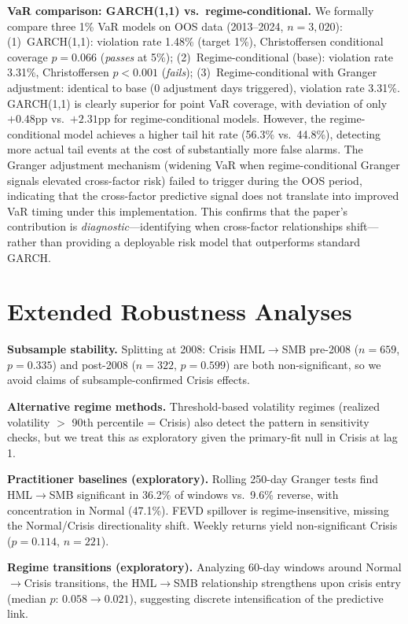 \documentclass[sigconf,anonymous]{acmart}
\begin{document}
\textbf{VaR comparison: GARCH(1,1) vs.\ regime-conditional.}
We formally compare three 1\% VaR models on OOS data (2013--2024, $n = 3{,}020$):
(1)~GARCH(1,1): violation rate 1.48\% (target 1\%), Christoffersen
conditional coverage $p = 0.066$ (\emph{passes} at 5\%);
(2)~Regime-conditional (base): violation rate 3.31\%,
Christoffersen $p < 0.001$ (\emph{fails});
(3)~Regime-conditional with Granger adjustment: identical to base
(0 adjustment days triggered), violation rate 3.31\%.
GARCH(1,1) is clearly superior for point VaR coverage, with deviation
of only $+0.48$pp vs.\ $+2.31$pp for regime-conditional models.
However, the regime-conditional model achieves a higher tail hit rate
(56.3\% vs.\ 44.8\%), detecting more actual tail events at the cost of
substantially more false alarms.
The Granger adjustment mechanism (widening VaR when regime-conditional
Granger signals elevated cross-factor risk) failed to trigger during
the OOS period, indicating that the cross-factor predictive signal
does not translate into improved VaR timing under this implementation.
This confirms that the paper's contribution is \emph{diagnostic}---identifying
when cross-factor relationships shift---rather than providing a
deployable risk model that outperforms standard GARCH.

\section{Extended Robustness Analyses}
\label{app:robustness}

\textbf{Subsample stability.} Splitting at 2008: Crisis HML$\to$SMB
pre-2008 ($n = 659$, $p = 0.335$) and post-2008 ($n = 322$, $p = 0.599$)
are both non-significant, so we avoid claims of subsample-confirmed Crisis effects.

\textbf{Alternative regime methods.} Threshold-based volatility regimes
(realized volatility $>$ 90th percentile = Crisis) also detect the pattern
in sensitivity checks, but we treat this as exploratory given the primary-fit
null in Crisis at lag 1.

\textbf{Practitioner baselines (exploratory).} Rolling 250-day Granger tests
find HML$\to$SMB significant in 36.2\% of windows vs.\ 9.6\% reverse,
with concentration in Normal (47.1\%). FEVD spillover is regime-insensitive,
missing the Normal/Crisis directionality shift.
Weekly returns yield non-significant Crisis ($p = 0.114$, $n = 221$).

\textbf{Regime transitions (exploratory).} Analyzing 60-day windows around Normal$\to$Crisis
transitions, the HML$\to$SMB relationship strengthens upon crisis entry
(median $p$: $0.058 \to 0.021$), suggesting discrete intensification of the
predictive link.
\end{document}
